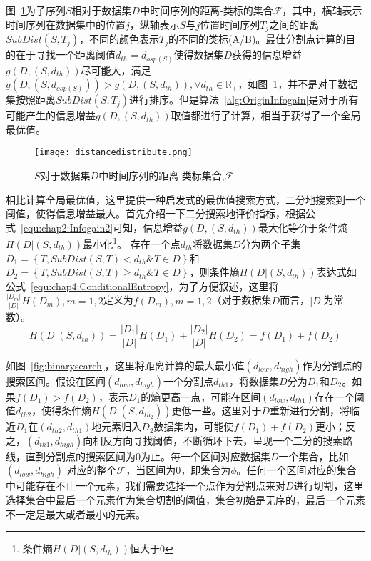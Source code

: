图~\ref{fig:distancedistribute}为子序列$S$相对于数据集$D$中时间序列的距离-类标的集合$\mathcal{F}$，其中，横轴表示时间序列在数据集中的位置$j$，纵轴表示$S$与$j$位置时间序列$T_j$之间的距离$SubDist(S,T_j)$，不同的颜色表示$T_j$的不同的类标(A/B)。最佳分割点计算的目的在于寻找一个距离阈值$d_{th}=d_{osp(S)}$使得数据集$D$获得的信息增益$g(D,(S,d_{th}))$尽可能大，满足$g(D,(S,d_{osp(S)}))>g(D,(S,d_{th})),\forall d_{th}\in \mathbb{R}_+$，如图~\ref{fig:distancedistribute}，并不是对于数据集按照距离$SubDist(S,T_j)$进行排序。但是算法~\ref{alg:OriginInfogain}是对于所有可能产生的信息增益$g(D,(S,d_{th}))$取值都进行了计算，相当于获得了一个全局最优值。
\begin{figure}[H] %
	\centering
	\texttt{[image: distancedistribute.png]}
	\caption{$S$对于数据集$D$中时间序列的距离-类标集合,$\mathcal{F}$}
	\label{fig:distancedistribute}
\end{figure}

相比计算全局最优值，这里提供一种启发式的最优值搜索方式，二分地搜索到一个阈值，使得信息增益最大。首先介绍一下二分搜索地评价指标，根据公式~\ref{equ:chap2:Infogain2}可知，信息增益$g(D,(S,d_{th}))$最大化等价于条件熵$H(D|(S,d_{th}))$最小化\footnote{条件熵$H(D|(S,d_{th}))$恒大于$0$}。
存在一个点$d_{th}$将数据集$D$分为两个子集$D_1 = \left\lbrace T,SubDist(S,T)<d_{th} \& T\in D\right\rbrace $和$D_2 = \left\lbrace T,SubDist(S,T) \geq d_{th}\& T\in D\right\rbrace$，则条件熵$H(D|(S,d_{th}))$表达式如公式~\ref{equ:chap4:ConditionalEntropy}，为了方便叙述，这里将$\frac{|D_m|}{|D|}H(D_m),m=1,2$定义为$f(D_m),m=1,2$（对于数据集$D$而言，$|D|$为常数）。
\begin{equation}
\label{equ:chap4:ConditionalEntropy}
H(D|(S,d_{th})) = \frac{|D_1|}{|D|}H(D_1)+\frac{|D_2|}{|D|}H(D_2) = f(D_1) + f(D_2)
\end{equation}

如图~\ref{fig:binarysearch}，这里将距离计算的最大最小值$(d_{low},d_{high})$作为分割点的搜索区间。假设在区间$(d_{low},d_{high})$一个分割点$d_{th1}$，将数据集$D$分为$D_1$和$D_2$。如果$f(D_1)>f(D_2)$，表示$D_1$的熵更高一点，可能在区间$(d_{low},d_{th1})$存在一个阈值$d_{th2}$，使得条件熵$H(D|(S,d_{th_2}))$更低一些。这里对于$D$重新进行分割，将临近$D_1$在$(d_{th2},d_{th1})$地元素归入$D_2$数据集内，可能使$f(D_1)+f(D_2)$更小；反之，$(d_{th1},d_{high})$向相反方向寻找阈值，不断循环下去，呈现一个二分的搜索路线，直到分割点的搜索区间为0为止。每一个区间对应数据集$D$一个集合，比如$(d_{low},d_{high})$ 对应的整个$\mathcal{F}$，当区间为0，即集合为$\phi$。任何一个区间对应的集合中可能存在不止一个元素，我们需要选择一个点作为分割点来对$D$进行切割，这里选择集合中最后一个元素作为集合切割的阈值，集合初始是无序的，最后一个元素不一定是最大或者最小的元素。 


